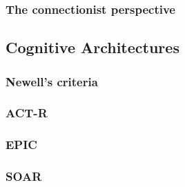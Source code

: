 \subsubsection{The connectionist perspective}

\subsection{Cognitive Architectures}

\subsubsection{Newell's criteria}

\subsubsection{ACT-R}

\subsubsection{EPIC}

\subsubsection{SOAR} 
\label{ClassicalPerspective}
   

